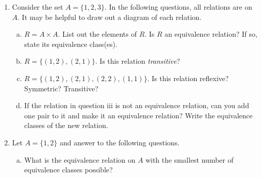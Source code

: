 \documentclass[12pt,letterpaper]{article}
\begin{document}
	\begin{enumerate}[1.]
        
		\item Consider the set $A = \{1,2,3\}$. In the following questions, all relations are on $A$. It may be helpful to draw out a diagram of each relation.
		
			\begin{enumerate}[a.]
				\item $R = A \times A$. List out the elements of $R$. Is $R$ an equivalence relation? If so, state its equivalence class(es).

				\begin{mdframed} \vspace{2cm} \end{mdframed}
				
				
				\item  $R = \{(1, 2), (2, 1)\}$. Is this relation \textit{transitive}?
				
				\begin{mdframed} \vspace{1cm} \end{mdframed}
				
				\item  $R = \{(1, 2), (2, 1),(2,2),(1,1)\}$. Is this relation reflexive? Symmetric? Transitive?
				
				\begin{mdframed} \vspace{2cm} \end{mdframed}
				
				\item If the relation in question iii is not an equivalence relation, can you add one pair to it and make it an equivalence relation? Write the equivalence classes of the new relation. 
				
				\begin{mdframed} \vspace{2cm} \end{mdframed}
				
				\end{enumerate}
	\item Let $A=\{1,2\}$ and answer to the following questions.
				\begin{enumerate}[a.]
				
				\item What is the equivalence relation on $A$ with the smallest number of equivalence classes possible?
				
				\begin{mdframed} \vspace{1cm} \end{mdframed}
				

\end{enumerate}
\end{enumerate}
\end{document}
